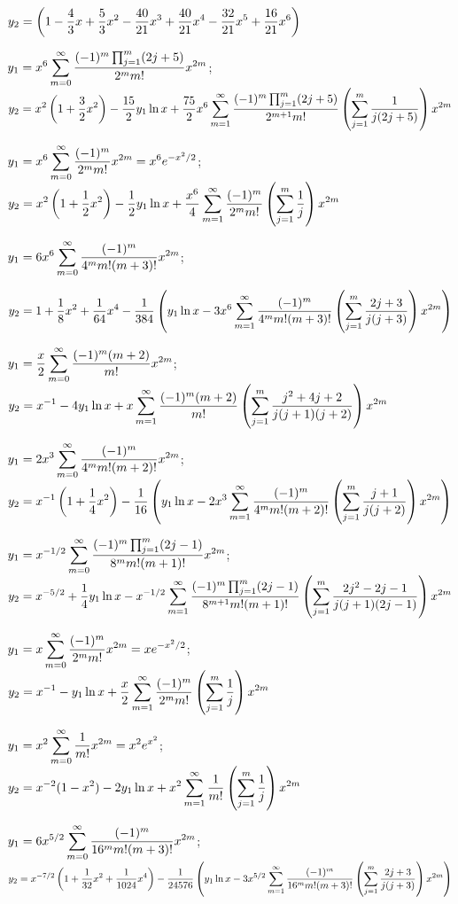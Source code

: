 $y_2=\displaystyle\left(1-\frac{4}{3}x+\frac{5}{3}x^2-\frac{40}{21}x^3
+\frac{40}{21}x^4-\frac{32}{21}x^5+\frac{16}{21}x^6\right)$

$\displaystyle{y_1=x^6\sum_{m=0}^\infty\frac{(-1)^m\prod_{j=1}^m(2j+5)}{2^mm!}x^{2m}}$;
$\displaystyle{y_2=x^2\left(1+\frac{3}{2}x^2\right)-\frac{15}{2}y_1\ln x+
\frac{75}{2}x^6\sum_{m=1}^\infty
\frac{(-1)^m\prod_{j=1}^m(2j+5)}{2^{m+1}m!}
\left(\sum_{j=1}^m\frac{1}{j(2j+5)}\right) x^{2m}}$

$\displaystyle{y_1=x^6\sum_{m=0}^\infty\frac{(-1)^m}{2^mm!}x^{2m}=x^6e^{-x^2/2}}$;\;
$\displaystyle{y_2=x^2\left(1+\frac{1}{2}x^2\right)-\frac{1}{2}y_1\ln
x+\frac{x^6}{4}\sum_{m=1}^\infty\frac{(-1)^m}{2^mm!}\left(\sum_{j=1}^m\frac{1}{j}\right)x^{2m}}$

$\displaystyle{y_1=6x^6\sum_{m=0}^\infty\frac{(-1)^m}{4^mm!(m+3)!}x^{2m}}$;\;

$\displaystyle{y_2=1+\frac{1}{8}x^2+\frac{1}{64}x^4-\frac{1}{384}\left(
y_1\ln x-3x^6\sum_{m=1}^\infty\frac{(-1)^m}{4^mm!(m+3)!}
\left(\sum_{j=1}^m\frac{2j+3}{j(j+3)}\right)x^{2m}\right)}$

$\displaystyle{y_1=\frac{x}{2}\sum_{m=0}^\infty\frac{(-1)^m(m+2)}{m!}x^{2m}}$;\;
$\displaystyle{y_2=x^{-1}-4y_1\ln x+x\sum_{m=1}^\infty\frac{(-1)^m(m+2)}{m!}\left(\sum_{j=1}^m\frac{j^2+4j+2}{j(j+1)(j+2)} \right)x^{2m}}$

$\displaystyle{y_1=2x^3\sum_{m=0}^\infty\frac{(-1)^m}{4^mm!(m+2)!}x^{2m}}$;\;
$\displaystyle{y_2=x^{-1}\left(1+\frac{1}{4}x^2\right)-\frac{1}{16}\left(
y_1\ln
x-2x^3\sum_{m=1}^\infty\frac{(-1)^m}{4^mm!(m+2)!}
\left(\sum_{j=1}^m\frac{j+1}{j(j+2)} \right)x^{2m}\right)}$

$\displaystyle{y_1=x^{-1/2}\sum_{m=0}^\infty\frac{(-1)^m\prod_{j=1}^m(2j-1)}{8^mm!(m+1)!}
x^{2m}}$;\;
$\displaystyle{y_2=x^{-5/2}+\frac{1}{4}y_1\ln x
-x^{-1/2}\sum_{m=1}^\infty\frac{(-1)^m\prod_{j=1}^m(2j-1)}{8^{m+1}m!(m+1)!}
\left(\sum_{j=1}^m\frac{2j^2-2j-1}{j(j+1)(2j-1)}\right) x^{2m}}$

$\displaystyle{y_1=x\sum_{m=0}^\infty\frac{(-1)^m}{2^mm!}x^{2m}=xe^{-x^2/2}}$;\;
$\displaystyle{y_2=x^{-1}-y_1\ln x+\frac{x}{2}
\sum_{m=1}^\infty\frac{(-1)^m}{2^mm!}\left(\sum_{j=1}^m\frac{1}{j}\right)x^{2m}}$

$\displaystyle{y_1=x^2\sum_{m=0}^\infty\frac{1}{m!}x^{2m}=x^2e^{x^2}}$;\;
$\displaystyle{y_2=x^{-2}(1-x^2)-2y_1\ln x+x^2\sum_{m=1}^\infty\frac{1}{m!}\left(\sum_{j=1}^m\frac{1}{j}\right)x^{2m}}$

$\displaystyle y_1=6x^{5/2}\sum_{m=0}^\infty\frac{(-1)^m}{16^mm!(m+3)!}x^{2m}$;
$\displaystyle y_2=x^{-7/2}\left(1+\frac{1}{32}x^2+\frac{1}{1024}x^4\right)
-\frac{1}{24576}\left(y_1\ln x-3x^{5/2}
\sum_{m=1}^\infty\frac{(-1)^m}{16^mm!(m+3)!}
\left(\sum_{j=1}^m\frac{2j+3}{j(j+3)}\right)x^{2m}\right)$

